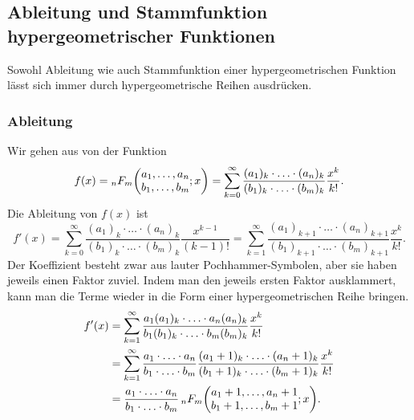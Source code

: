 %
%
\subsection{Ableitung und Stammfunktion hypergeometrischer Funktionen
\label{buch:rekursion:hypergeometrisch:stammableitung}}
Sowohl Ableitung wie auch Stammfunktion einer hypergeometrischen
Funktion lässt sich immer durch hypergeometrische Reihen ausdrücken.
%
%
\subsubsection{Ableitung}
%
Wir gehen aus von der Funktion
\begin{equation}
f(x)
=
\mathstrut_nF_m\biggl(
\begin{matrix}a_1,\dots,a_n\\b_1,\dots,b_m\end{matrix};
x\biggr)
=
\sum_{k=0}^\infty
\frac{
(a_1)_k\cdot\ldots\cdot(a_n)_k
}{
(b_1)_k\cdot\ldots\cdot(b_m)_k
}
\frac{x^k}{k!}.
\label{buch:rekursion:hypergeometrisch:eqn:f}
\end{equation}
Die Ableitung von $f(x)$ ist
\[
f'(x)
=
\sum_{k=0}^\infty
\frac{
(a_1)_k\cdot\ldots\cdot(a_n)_k
}{
(b_1)_k\cdot\ldots\cdot(b_m)_k
}
\frac{x^{k-1}}{(k-1)!}
=
\sum_{k=1}^\infty
\frac{
(a_1)_{k+1}\cdot\ldots\cdot(a_n)_{k+1}
}{
(b_1)_{k+1}\cdot\ldots\cdot(b_m)_{k+1}
}
\frac{x^k}{k!}.
\]
Der Koeffizient besteht zwar aus lauter Pochhammer-Symbolen, aber sie
haben jeweils einen Faktor zuviel.
Indem man den jeweils ersten Faktor ausklammert, kann man die
Terme wieder in die Form einer hypergeometrischen Reihe bringen.
\begin{align*}
f'(x)
&=
\sum_{k=1}^\infty
\frac{
a_1(a_1)_{k}\cdot\ldots\cdot a_n(a_n)_{k}
}{
b_1(b_1)_{k}\cdot\ldots\cdot b_m(b_m)_{k}
}
\frac{x^k}{k!}
\\
&=
\sum_{k=1}^\infty
\frac{
a_1\cdot\ldots\cdot a_n
}{
b_1\cdot\ldots\cdot b_m
}
\frac{
(a_1+1)_{k}\cdot\ldots\cdot(a_n+1)_{k}
}{
(b_1+1)_{k}\cdot\ldots\cdot(b_m+1)_{k}
}
\frac{x^k}{k!}
\\
&=
\frac{
a_1\cdot\ldots\cdot a_n
}{
b_1\cdot\ldots\cdot b_m
}
\,
\mathstrut_nF_m\biggl(
\begin{matrix}a_1+1,\dots,a_n+1\\b_1+1,\dots,b_m+1\end{matrix};
x\biggr).
\end{align*}

